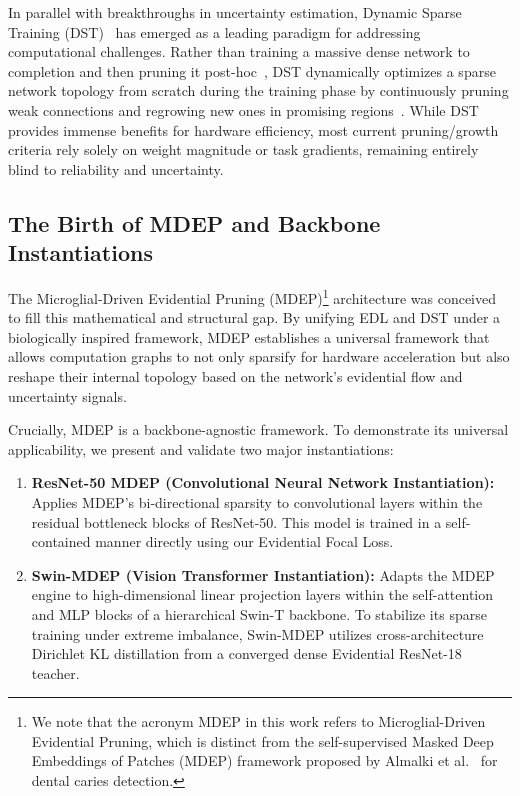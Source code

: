 \documentclass[letterpaper]{article} %
\begin{document}
In parallel with breakthroughs in uncertainty estimation, Dynamic Sparse Training (DST)~\cite{evci2020rigging, mocanu2018scalable} has emerged as a leading paradigm for addressing computational challenges. Rather than training a massive dense network to completion and then pruning it post-hoc~\cite{han2016deep, frankle2019lottery}, DST dynamically optimizes a sparse network topology from scratch during the training phase by continuously pruning weak connections and regrowing new ones in promising regions~\cite{hoefler2021sparsity}. While DST provides immense benefits for hardware efficiency, most current pruning/growth criteria rely solely on weight magnitude or task gradients, remaining entirely blind to reliability and uncertainty.

\subsection{The Birth of MDEP and Backbone Instantiations}

The Microglial-Driven Evidential Pruning (MDEP)\footnote{We note that the acronym MDEP in this work refers to Microglial-Driven Evidential Pruning, which is distinct from the self-supervised Masked Deep Embeddings of Patches (MDEP) framework proposed by Almalki et al.~\cite{almalki2025self} for dental caries detection.} architecture was conceived to fill this mathematical and structural gap. By unifying EDL and DST under a biologically inspired framework, MDEP establishes a universal framework that allows computation graphs to not only sparsify for hardware acceleration but also reshape their internal topology based on the network's evidential flow and uncertainty signals.

Crucially, MDEP is a backbone-agnostic framework. To demonstrate its universal applicability, we present and validate two major instantiations:
\begin{enumerate}
    \item \textbf{ResNet-50 MDEP (Convolutional Neural Network Instantiation):} Applies MDEP's bi-directional sparsity to convolutional layers within the residual bottleneck blocks of ResNet-50. This model is trained in a self-contained manner directly using our Evidential Focal Loss.
    \item \textbf{Swin-MDEP (Vision Transformer Instantiation):} Adapts the MDEP engine to high-dimensional linear projection layers within the self-attention and MLP blocks of a hierarchical Swin-T backbone. To stabilize its sparse training under extreme imbalance, Swin-MDEP utilizes cross-architecture Dirichlet KL distillation from a converged dense Evidential ResNet-18 teacher.
\end{enumerate}
\end{document}
